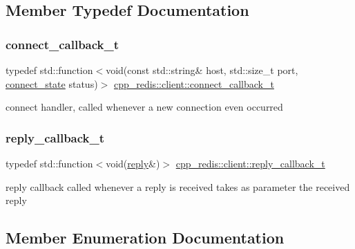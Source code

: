 \subsection{Member Typedef Documentation}
\mbox{\label{classcpp__redis_1_1client_a4bb592b64ededde5a6fcf8111ca2548f}} 
\subsubsection{\texorpdfstring{connect\+\_\+callback\+\_\+t}{connect\_callback\_t}}
{\footnotesize\ttfamily typedef std\+::function$<$void(const std\+::string\& host, std\+::size\+\_\+t port, \hyperlink{classcpp__redis_1_1client_a2512bd48dd45391249a69bd720c1e4da}{connect\+\_\+state} status)$>$ \hyperlink{classcpp__redis_1_1client_a4bb592b64ededde5a6fcf8111ca2548f}{cpp\+\_\+redis\+::client\+::connect\+\_\+callback\+\_\+t}}

connect handler, called whenever a new connection even occurred \mbox{\label{classcpp__redis_1_1client_a061a1140d36d2eaeda82b09a0bb3f9f2}} 
\subsubsection{\texorpdfstring{reply\+\_\+callback\+\_\+t}{reply\_callback\_t}}
{\footnotesize\ttfamily typedef std\+::function$<$void(\hyperlink{classcpp__redis_1_1reply}{reply}\&)$>$ \hyperlink{classcpp__redis_1_1client_a061a1140d36d2eaeda82b09a0bb3f9f2}{cpp\+\_\+redis\+::client\+::reply\+\_\+callback\+\_\+t}}

reply callback called whenever a reply is received takes as parameter the received reply 

\subsection{Member Enumeration Documentation}
\mbox{\label{classcpp__redis_1_1client_a388877b01b4e045cddb138e70a68e000}} 
